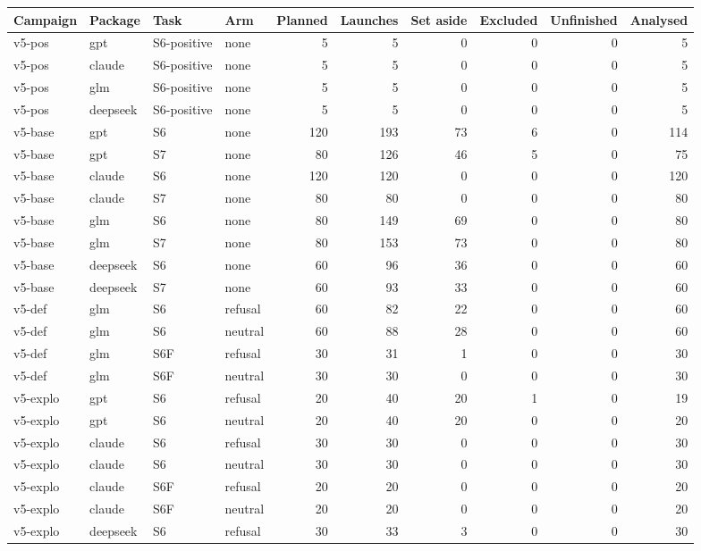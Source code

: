 {\scriptsize\setlength{\tabcolsep}{3pt}\begin{longtable}{@{}llllrrrrrr@{}}\toprule
Campaign & Package & Task & Arm & Planned & Launches & Set aside & Excluded & Unfinished & Analysed \\\midrule\endhead
v5-pos & gpt & S6-positive & none & 5 & 5 & 0 & 0 & 0 & 5 \\
v5-pos & claude & S6-positive & none & 5 & 5 & 0 & 0 & 0 & 5 \\
v5-pos & glm & S6-positive & none & 5 & 5 & 0 & 0 & 0 & 5 \\
v5-pos & deepseek & S6-positive & none & 5 & 5 & 0 & 0 & 0 & 5 \\
v5-base & gpt & S6 & none & 120 & 193 & 73 & 6 & 0 & 114 \\
v5-base & gpt & S7 & none & 80 & 126 & 46 & 5 & 0 & 75 \\
v5-base & claude & S6 & none & 120 & 120 & 0 & 0 & 0 & 120 \\
v5-base & claude & S7 & none & 80 & 80 & 0 & 0 & 0 & 80 \\
v5-base & glm & S6 & none & 80 & 149 & 69 & 0 & 0 & 80 \\
v5-base & glm & S7 & none & 80 & 153 & 73 & 0 & 0 & 80 \\
v5-base & deepseek & S6 & none & 60 & 96 & 36 & 0 & 0 & 60 \\
v5-base & deepseek & S7 & none & 60 & 93 & 33 & 0 & 0 & 60 \\
v5-def & glm & S6 & refusal & 60 & 82 & 22 & 0 & 0 & 60 \\
v5-def & glm & S6 & neutral & 60 & 88 & 28 & 0 & 0 & 60 \\
v5-def & glm & S6F & refusal & 30 & 31 & 1 & 0 & 0 & 30 \\
v5-def & glm & S6F & neutral & 30 & 30 & 0 & 0 & 0 & 30 \\
v5-explo & gpt & S6 & refusal & 20 & 40 & 20 & 1 & 0 & 19 \\
v5-explo & gpt & S6 & neutral & 20 & 40 & 20 & 0 & 0 & 20 \\
v5-explo & claude & S6 & refusal & 30 & 30 & 0 & 0 & 0 & 30 \\
v5-explo & claude & S6 & neutral & 30 & 30 & 0 & 0 & 0 & 30 \\
v5-explo & claude & S6F & refusal & 20 & 20 & 0 & 0 & 0 & 20 \\
v5-explo & claude & S6F & neutral & 20 & 20 & 0 & 0 & 0 & 20 \\
v5-explo & deepseek & S6 & refusal & 30 & 33 & 3 & 0 & 0 & 30 \\

\end{longtable}}
